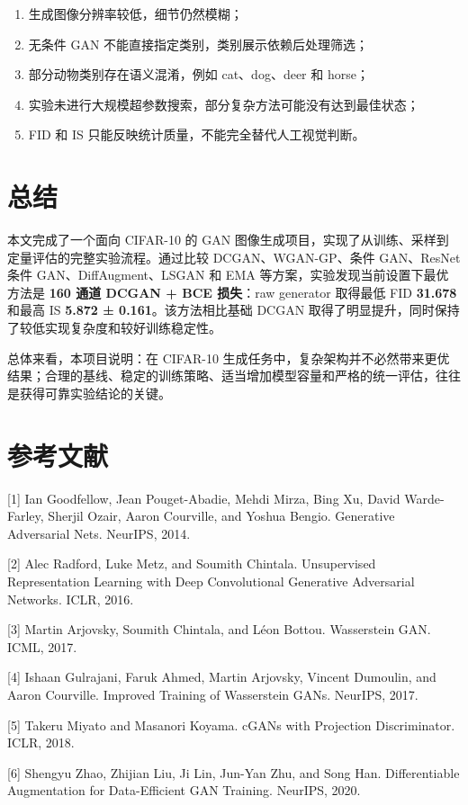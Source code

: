 \documentclass[UTF8,a4paper,12pt]{ctexart}
\begin{document}
\begin{enumerate}
\item 生成图像分辨率较低，细节仍然模糊；
\item 无条件 GAN 不能直接指定类别，类别展示依赖后处理筛选；
\item 部分动物类别存在语义混淆，例如 cat、dog、deer 和 horse；
\item 实验未进行大规模超参数搜索，部分复杂方法可能没有达到最佳状态；
\item FID 和 IS 只能反映统计质量，不能完全替代人工视觉判断。
\end{enumerate}


\section{总结}

本文完成了一个面向 CIFAR-10 的 GAN 图像生成项目，实现了从训练、采样到定量评估的完整实验流程。通过比较 DCGAN、WGAN-GP、条件 GAN、ResNet 条件 GAN、DiffAugment、LSGAN 和 EMA 等方案，实验发现当前设置下最优方法是 \textbf{160 通道 DCGAN + BCE 损失}：raw generator 取得最低 FID \textbf{31.678} 和最高 IS \textbf{5.872 ± 0.161}。该方法相比基础 DCGAN 取得了明显提升，同时保持了较低实现复杂度和较好训练稳定性。


总体来看，本项目说明：在 CIFAR-10 生成任务中，复杂架构并不必然带来更优结果；合理的基线、稳定的训练策略、适当增加模型容量和严格的统一评估，往往是获得可靠实验结论的关键。


\section{参考文献}

[1] Ian Goodfellow, Jean Pouget-Abadie, Mehdi Mirza, Bing Xu, David Warde-Farley, Sherjil Ozair, Aaron Courville, and Yoshua Bengio. Generative Adversarial Nets. NeurIPS, 2014.


[2] Alec Radford, Luke Metz, and Soumith Chintala. Unsupervised Representation Learning with Deep Convolutional Generative Adversarial Networks. ICLR, 2016.


[3] Martin Arjovsky, Soumith Chintala, and Léon Bottou. Wasserstein GAN. ICML, 2017.


[4] Ishaan Gulrajani, Faruk Ahmed, Martin Arjovsky, Vincent Dumoulin, and Aaron Courville. Improved Training of Wasserstein GANs. NeurIPS, 2017.


[5] Takeru Miyato and Masanori Koyama. cGANs with Projection Discriminator. ICLR, 2018.


[6] Shengyu Zhao, Zhijian Liu, Ji Lin, Jun-Yan Zhu, and Song Han. Differentiable Augmentation for Data-Efficient GAN Training. NeurIPS, 2020.
\end{document}
